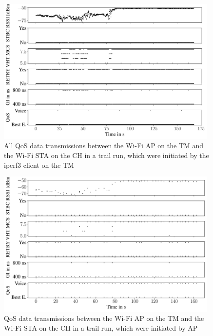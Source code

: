 \begin{figure}[H]%
	\centering
	\includegraphics[width=0.98\textwidth]{figures/wireless5_lan}
	\caption{All QoS data transmissions between the Wi-Fi \acf{AP} on the \acf{TM} and the Wi-Fi \ac{STA} on the \acf{CH} in a trail run,
	which were initiated by the iperf3 client on the \acf{TM}}
	\label{fig:trailrunIperf}%
\end{figure}

\begin{figure}[H]%
	\centering
	\includegraphics[width=0.98\textwidth]{figures/wireless5_ap}
	\caption{QoS data transmissions between the Wi-Fi \acf{AP} on the \acf{TM} and the Wi-Fi \ac{STA} on the \acf{CH} in a trail run,
	which were initiated by \ac{AP}}
	\label{fig:trailrunAP}%
\end{figure}

